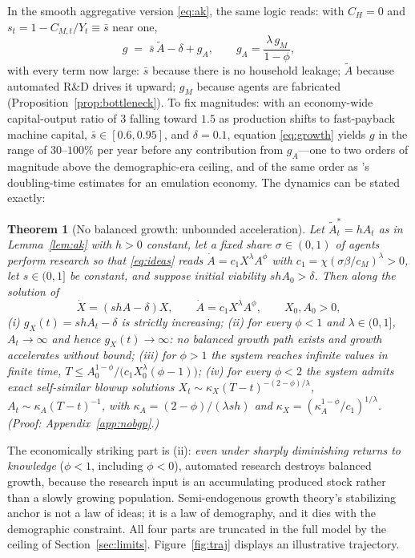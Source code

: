 \documentclass[11pt]{article}
\newtheorem{theorem}{Theorem}
\begin{document}
In the smooth aggregative version \eqref{eq:ak}, the same logic reads: with $C_H = 0$ and $s_t = 1 - C_{M,t}/Y_t \equiv \bar s$ near one,
\begin{equation}
g \;=\; \bar s\, \tilde A - \delta + g_A,
\qquad g_A = \frac{\lambda\, g_M}{1-\phi},
\label{eq:growth}
\end{equation}
with every term now large: $\bar s$ because there is no household leakage; $\tilde A$ because automated R\&D drives it upward; $g_M$ because agents are fabricated (Proposition~\ref{prop:bottleneck}). To fix magnitudes: with an economy-wide capital-output ratio of $3$ falling toward $1.5$ as production shifts to fast-payback machine capital, $\bar s \in [0.6, 0.95]$, and $\delta = 0.1$, equation \eqref{eq:growth} yields $g$ in the range of $30$--$100\%$ per year before any contribution from $g_A$---one to two orders of magnitude above the demographic-era ceiling, and of the same order as \citet{hanson2016}'s doubling-time estimates for an emulation economy. The dynamics can be stated exactly:

\begin{theorem}[No balanced growth: unbounded acceleration]\label{thm:nobgp}
Let $\tilde A^{*}_t = hA_t$ as in Lemma~\ref{lem:ak} with $h>0$ constant, let a fixed share $\sigma\in(0,1)$ of agents perform research so that \eqref{eq:ideas} reads $\dot A = c_1 X^{\lambda}A^{\phi}$ with $c_1 = \chi(\sigma\beta/c_M)^{\lambda}>0$, let $s\in(0,1]$ be constant, and suppose initial viability $shA_0 > \delta$. Then along the solution of
\[
\dot X = (shA-\delta)X, \qquad \dot A = c_1 X^{\lambda}A^{\phi}, \qquad X_0, A_0 > 0,
\]
(i) $g_X(t) = shA_t - \delta$ is strictly increasing; (ii) for every $\phi<1$ and $\lambda\in(0,1]$, $A_t \to \infty$ and hence $g_X(t)\to\infty$: no balanced growth path exists and growth accelerates without bound; (iii) for $\phi>1$ the system reaches infinite values in finite time, $T \le A_0^{1-\phi}/\big(c_1X_0^{\lambda}(\phi-1)\big)$; (iv) for every $\phi<2$ the system admits exact self-similar blowup solutions $X_t \sim \kappa_X (T-t)^{-(2-\phi)/\lambda}$, $A_t \sim \kappa_A (T-t)^{-1}$, with $\kappa_A = (2-\phi)/(\lambda sh)$ and $\kappa_X = (\kappa_A^{1-\phi}/c_1)^{1/\lambda}$. (Proof: Appendix~\ref{app:nobgp}.)
\end{theorem}

The economically striking part is (ii): \emph{even under sharply diminishing returns to knowledge} ($\phi<1$, including $\phi<0$), automated research destroys balanced growth, because the research input is an accumulating produced stock rather than a slowly growing population. Semi-endogenous growth theory's stabilizing anchor \citep{jones1995,jones2022} is not a law of ideas; it is a law of demography, and it dies with the demographic constraint. All four parts are truncated in the full model by the ceiling of Section~\ref{sec:limits}. Figure~\ref{fig:traj} displays an illustrative trajectory.
\end{document}
